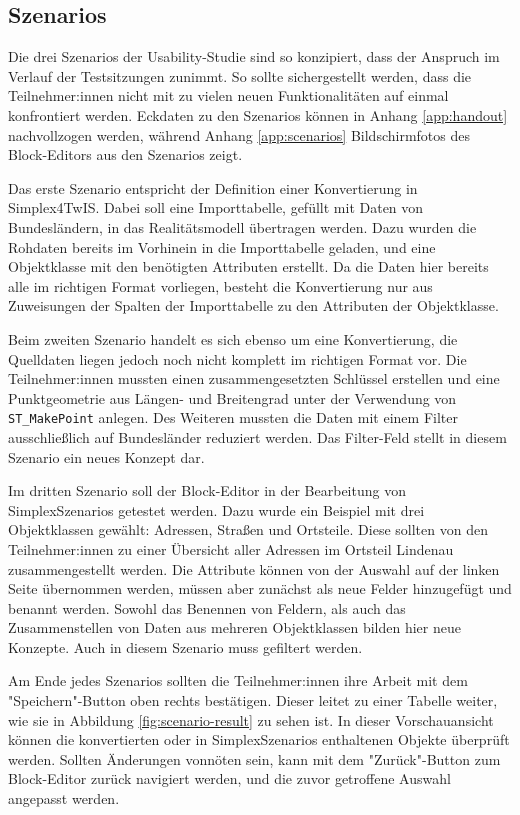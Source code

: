 \subsection{Szenarios}
\label{sec:study-szenarios}
Die drei Szenarios der Usability-Studie sind so konzipiert, dass der Anspruch im Verlauf der Testsitzungen zunimmt. So sollte sichergestellt werden, dass die Teilnehmer:innen nicht mit zu vielen neuen Funktionalitäten auf einmal konfrontiert werden. Eckdaten zu den Szenarios können in Anhang \ref{app:handout} nachvollzogen werden, während Anhang \ref{app:scenarios} Bildschirmfotos des Block-Editors aus den Szenarios zeigt.

Das erste Szenario entspricht der Definition einer Konvertierung in Simplex4TwIS. Dabei soll eine Importtabelle, gefüllt mit Daten von Bundesländern, in das Realitätsmodell übertragen werden. Dazu wurden die Rohdaten bereits im Vorhinein in die Importtabelle geladen, und eine Objektklasse mit den benötigten Attributen erstellt. Da die Daten hier bereits alle im richtigen Format vorliegen, besteht die Konvertierung nur aus Zuweisungen der Spalten der Importtabelle zu den Attributen der Objektklasse.

Beim zweiten Szenario handelt es sich ebenso um eine Konvertierung, die Quelldaten liegen jedoch noch nicht komplett im richtigen Format vor. Die Teilnehmer:innen mussten einen zusammengesetzten Schlüssel erstellen und eine Punktgeometrie aus Längen- und Breitengrad unter der Verwendung von \texttt{ST\_MakePoint} anlegen. Des Weiteren mussten die Daten mit einem Filter ausschließlich auf Bundesländer reduziert werden. Das Filter-Feld stellt in diesem Szenario ein neues Konzept dar.

Im dritten Szenario soll der Block-Editor in der Bearbeitung von SimplexSzenarios getestet werden. Dazu wurde ein Beispiel mit drei Objektklassen gewählt: Adressen, Straßen und Ortsteile. Diese sollten von den Teilnehmer:innen zu einer Übersicht aller Adressen im Ortsteil Lindenau zusammengestellt werden. Die Attribute können von der Auswahl auf der linken Seite übernommen werden, müssen aber zunächst als neue Felder hinzugefügt und benannt werden. Sowohl das Benennen von Feldern, als auch das Zusammenstellen von Daten aus mehreren Objektklassen bilden hier neue Konzepte. Auch in diesem Szenario muss gefiltert werden.

Am Ende jedes Szenarios sollten die Teilnehmer:innen ihre Arbeit mit dem "Speichern"-Button oben rechts bestätigen. Dieser leitet zu einer Tabelle weiter, wie sie in Abbildung \ref{fig:scenario-result} zu sehen ist. In dieser Vorschauansicht können die konvertierten oder in SimplexSzenarios enthaltenen Objekte überprüft werden. Sollten Änderungen vonnöten sein, kann mit dem "Zurück"-Button zum Block-Editor zurück navigiert werden, und die zuvor getroffene Auswahl angepasst werden.

